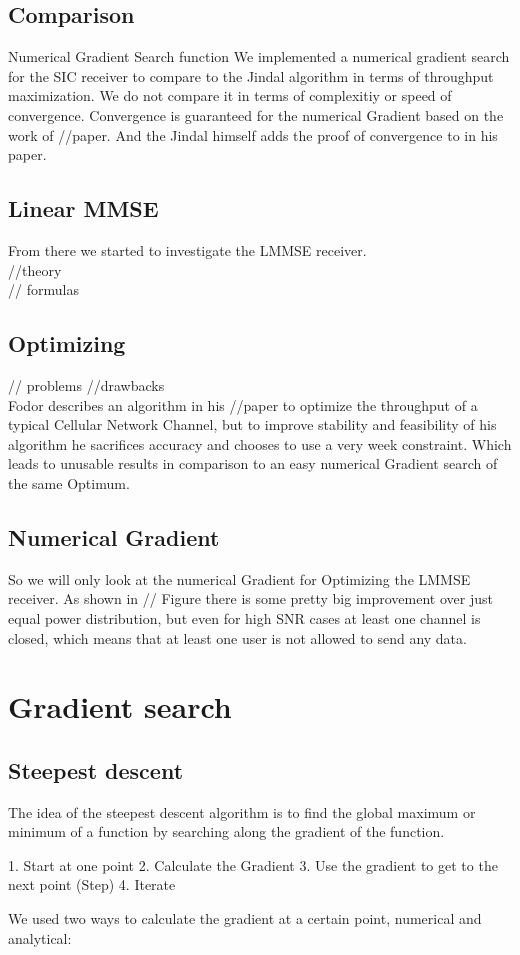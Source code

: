 \section{Comparison}
Numerical Gradient Search function
We implemented a numerical gradient search for the SIC receiver to compare to the Jindal algorithm in terms of throughput maximization. We do not compare it in terms of complexitiy or speed of convergence.
Convergence is guaranteed for the numerical Gradient based on the work of //paper. And the Jindal himself adds the proof of convergence to in his paper.
\section{Linear MMSE}
From there we started to investigate the LMMSE receiver.\\
//theory\\
// formulas\\
\section{Optimizing}
// problems //drawbacks\\
Fodor describes an algorithm in his //paper to optimize the throughput of a typical Cellular Network Channel, but to improve stability and feasibility of his algorithm he sacrifices accuracy and chooses to use a very week constraint. Which leads to unusable results in comparison to an easy numerical Gradient search of the same Optimum.

\section{Numerical Gradient}
So we will only look at the numerical Gradient for Optimizing the LMMSE receiver. As shown in // Figure there is some pretty big improvement over just equal power distribution, but even for high SNR cases at least one channel is closed, which means that at least one user is not allowed to send any data.


\chapter{Gradient search}
\section{Steepest descent}
The idea of the steepest descent algorithm is to find the global maximum or minimum of a function by searching along the gradient of the function.
\begin{algorithm}
	1.	Start at one point
	2.	Calculate the Gradient
	3.	Use the gradient to get to the next point (Step)
	4.	Iterate
\end{algorithm}
We used two ways to calculate the gradient at a certain point, numerical and analytical:

